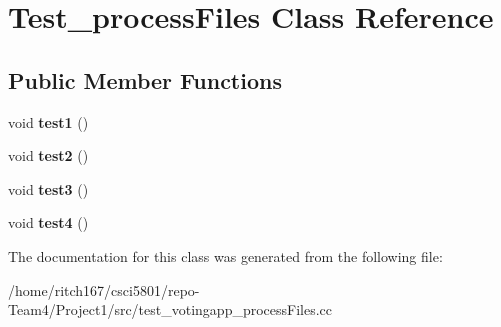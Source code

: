 \hypertarget{classTest__processFiles}{}\section{Test\+\_\+process\+Files Class Reference}
\label{classTest__processFiles}
\subsection*{Public Member Functions}
\begin{DoxyCompactItemize}
\item 
\mbox{\label{classTest__processFiles_aa2bb42a713d1033bd9bab63342bcfcc0}} 
void {\bfseries test1} ()
\item 
\mbox{\label{classTest__processFiles_aa542b00829251b1489415827468c3e7d}} 
void {\bfseries test2} ()
\item 
\mbox{\label{classTest__processFiles_a11f523c22f279b0077883ef5482fe860}} 
void {\bfseries test3} ()
\item 
\mbox{\label{classTest__processFiles_ae60f3f191f04e43d11e727a68d4abb36}} 
void {\bfseries test4} ()
\end{DoxyCompactItemize}


The documentation for this class was generated from the following file\+:\begin{DoxyCompactItemize}
\item 
/home/ritch167/csci5801/repo-\/\+Team4/\+Project1/src/test\+\_\+votingapp\+\_\+process\+Files.\+cc\end{DoxyCompactItemize}

